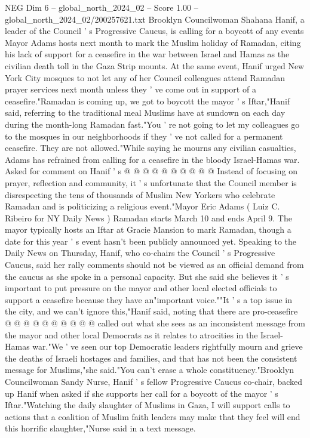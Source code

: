 \begin{textsample}{NEG Dim 6 – global\_north\_2024\_02 – Score 1.00 – global\_north\_2024\_02/200257621.txt}  \label{ex:f6_neg_254}
Brooklyn Councilwoman Shahana Hanif, a leader of the Council ' s Progressive Caucus, is calling for a boycott of any events Mayor Adams hosts next month to mark the Muslim holiday of Ramadan, citing his lack of support for a ceasefire in the war between Israel and Hamas as the civilian death toll in the Gaza Strip mounts.
At the same event, Hanif urged New York City mosques to not let any of her Council colleagues attend Ramadan prayer services next month unless they ' ve come out in support of a ceasefire."Ramadan is coming up, we got to boycott the mayor ' s Iftar,"Hanif said, referring to the traditional meal Muslims have at sundown on each day during the month-long Ramadan fast."You ' re not going to let my colleagues go to the mosques in our neighborhoods if they ' ve not called for a permanent ceasefire.
They are not allowed."While saying he mourns any civilian casualties, Adams has refrained from calling for a ceasefire in the bloody Israel-Hamas war.
Asked for comment on Hanif ' s @ @ @ @ @ @ @ @ @ @ Instead of focusing on prayer, reflection and community, it ' s unfortunate that the Council member is disrespecting the tens of thousands of Muslim New Yorkers who celebrate Ramadan and is politicizing a religious event."Mayor Eric Adams ( Luiz C.
Ribeiro for NY Daily News ) Ramadan starts March 10 and ends April 9.
The mayor typically hosts an Iftar at Gracie Mansion to mark Ramadan, though a date for this year ' s event hasn't been publicly announced yet.
Speaking to the Daily News on Thursday, Hanif, who co-chairs the Council ' s Progressive Caucus, said her rally comments should not be viewed as an official demand from the caucus as she spoke in a personal capacity.
But she said she believes it ' s important to put pressure on the mayor and other local elected officials to support a ceasefire because they have an"important voice.""It ' s a top issue in the city, and we can't ignore this,"Hanif said, noting that there are pro-ceasefire @ @ @ @ @ @ @ @ @ @ called out what she sees as an inconsistent message from the mayor and other local Democrats as it relates to atrocities in the Israel-Hamas war."We ' ve seen our top Democratic leaders rightfully mourn and grieve the deaths of Israeli hostages and families, and that has not been the consistent message for Muslims,"she said."You can't erase a whole constituency."Brooklyn Councilwoman Sandy Nurse, Hanif ' s fellow Progressive Caucus co-chair, backed up Hanif when asked if she supports her call for a boycott of the mayor ' s Iftar."Watching the daily slaughter of Muslims in Gaza, I will support calls to actions that a coalition of Muslim faith leaders may make that they feel will end this horrific slaughter,"Nurse said in a text message.

\end{textsample}
